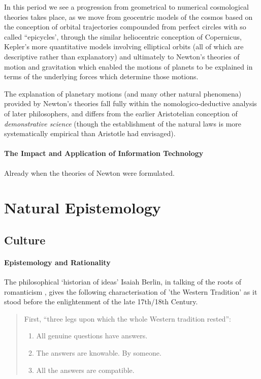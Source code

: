 \documentclass[10pt,titlepage]{book}
\begin{document}
In this period we see a progression from geometrical to numerical cosmological theories takes place, as we move from geocentric models of the cosmos based on the conception of orbital trajectories compounded from perfect circles with so called ``epicycles', through the similar heliocentric conception of Copernicus, Kepler's more quantitative models involving elliptical orbits (all of which are descriptive rather than explanatory) and ultimately to Newton's theories of motion and gravitation which enabled the motions of planets to be explained in terms of the underlying forces which determine those motions.

The explanation of planetary motions (and many other natural phenomena) provided by Newton's theories fall fully within the nomologico-deductive analysis of later philosophers, and differs from the earlier Aristotelian conception of \emph{demonstrative science} (though the establishment of the natural laws is more systematically empirical than Aristotle had envisaged).



\subsection{The Impact and Application of Information Technology}

Already when the theories of Newton were formulated.



\part{Natural Epistemology}



\chapter{Culture}
\subsection{Epistemology and Rationality}

The philosophical `historian of ideas' Isaiah Berlin, in talking of the roots of romanticism \cite{berlinRR}, gives the following characterisation of 'the Western Tradition' as it stood before the enlightenment of the late 17th/18th Century.

\begin{quotation}

First, ``three legs upon which the whole Western tradition rested'':
\begin{enumerate}
\item All genuine questions have answers.
\item The answers are knowable.  By someone.
\item All the answers are compatible.
\end{enumerate}
\end{quotation}
\end{document}
